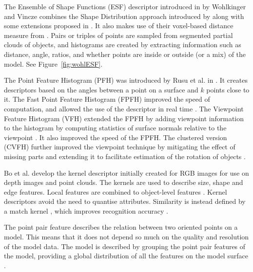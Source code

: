 \documentclass[11pt,a4paper]{kth-mag}
\begin{document}
The Ensemble of Shape Functions (ESF) descriptor introduced in
\cite{wohlkinger2011ensemble} by Wohlkinger and Vincze combines the Shape
Distribution approach introduced by \cite{osada2002shape} along with some
extensions proposed in \cite{ip2002using}. It also makes use of their
voxel-based distance measure from \cite{wohlkinger2011shapedist}. Pairs or triples of
points are sampled from segmented partial clouds of objects, and histograms are
created by extracting information such as distance, angle, ratios, and whether
points are inside or outside (or a mix) of the model. See
Figure~\ref{fig:wohlESF}.

The Point Feature Histogram (PFH) was introduced by Rusu et al. in
\cite{rusu2008persistent}. It creates descriptors based on the angles between a
point on a surface and $k$ points close to it. The Fast Point Feature Histogram
(FPFH) improved the speed of computation, and allowed the use of the descriptor
in real time \cite{rusu2009fast}. The Viewpoint Feature Histogram (VFH) extended
the FPFH by adding viewpoint information to the histogram by computing
statistics of surface normals relative to the viewpoint \cite{rusu2010fast}. It
also improved the speed of the FPFH. The clustered version (CVFH) further
improved the viewpoint technique by mitigating the effect of missing parts and
extending it to facilitate estimation of the rotation of objects \cite{aldoma2011cad}.

Bo et al. develop the kernel descriptor initially created for RGB images for use
on depth images and point clouds. The kernels are used to describe size, shape
and edge features. Local features are combined to object-level features . Kernel
descriptors avoid the need to quantise attributes. Similarity is instead defined
by a match kernel \cite{bo2010kernel}, which improves recognition accuracy
\cite{bo2011depth}.

The point pair feature describes the relation between two oriented points on a
model. This means that it does not depend so much on the quality and resolution
of the model data. The model is described by grouping the point pair features of
the model, providing a global distribution of all the features on the model
surface \cite{drost2010model}.
\end{document}
